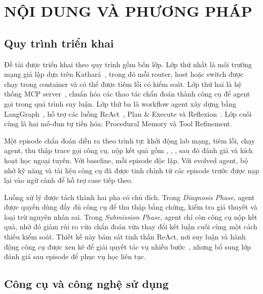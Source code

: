 \section{NỘI DUNG VÀ PHƯƠNG PHÁP}

\subsection{Quy trình triển khai}

Đề tài được triển khai theo quy trình gồm bốn lớp. Lớp thứ nhất là môi trường mạng giả lập dựa trên Kathará~\citep{kathara2019}, trong đó mỗi router, host hoặc switch được chạy trong container và có thể được tiêm lỗi có kiểm soát. Lớp thứ hai là hệ thống MCP server~\citep{mcp2024}, chuẩn hóa các thao tác chẩn đoán thành công cụ để agent gọi trong quá trình suy luận. Lớp thứ ba là workflow agent xây dựng bằng LangGraph~\citep{langgraph2024}, hỗ trợ các luồng ReAct~\citep{react2023}, Plan \& Execute và Reflexion~\citep{reflexion2023}. Lớp cuối cùng là hai mô-đun tự tiến hóa: Procedural Memory và Tool Refinement.

Một episode chẩn đoán diễn ra theo trình tự: khởi động lab mạng, tiêm lỗi, chạy agent, thu thập trace gọi công cụ, nộp kết quả gồm , , , sau đó đánh giá và kích hoạt học ngoại tuyến. Với baseline, mỗi episode độc lập. Với evolved agent, bộ nhớ kỹ năng và tài liệu công cụ đã được tinh chỉnh từ các episode trước được nạp lại vào ngữ cảnh để hỗ trợ case tiếp theo.

Luồng xử lý được tách thành hai pha có chủ đích. Trong \textit{Diagnosis Phase}, agent được quyền dùng đầy đủ công cụ để thu thập bằng chứng, kiểm tra giả thuyết và loại trừ nguyên nhân sai. Trong \textit{Submission Phase}, agent chỉ còn công cụ nộp kết quả, nhờ đó giảm rủi ro vừa chẩn đoán vừa thay đổi kết luận cuối cùng một cách thiếu kiểm soát. Thiết kế này bám sát tinh thần ReAct, nơi suy luận và hành động công cụ được xen kẽ để giải quyết tác vụ nhiều bước~\citep{react2023}, nhưng bổ sung lớp đánh giá sau episode để phục vụ học liên tục.

\subsection{Công cụ và công nghệ sử dụng}

